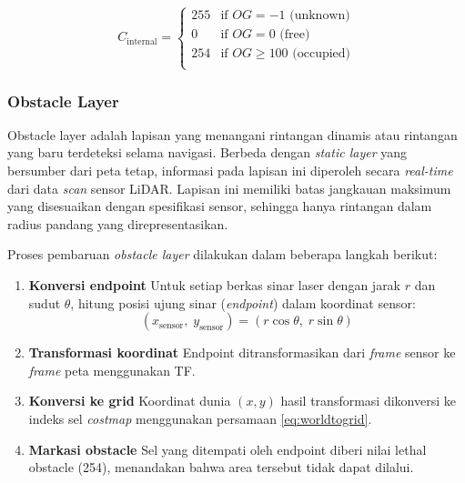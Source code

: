 \begin{equation}C_{\text{internal}} = \begin{cases} 255 & \text{if } OG = -1 \text{ (unknown)} \\ 0 & \text{if } OG = 0 \text{ (free)} \\ 254 & \text{if } OG \geq 100 \text{ (occupied)} \\  \end{cases}\end{equation}

\subsubsection{Obstacle Layer}

Obstacle layer adalah lapisan yang menangani rintangan dinamis atau
rintangan yang baru terdeteksi selama navigasi. Berbeda dengan
\emph{static layer} yang bersumber dari peta tetap, informasi pada
lapisan ini diperoleh secara \emph{real-time} dari data \emph{scan}
sensor LiDAR. Lapisan ini memiliki batas jangkauan maksimum yang
disesuaikan dengan spesifikasi sensor, sehingga hanya rintangan dalam
radius pandang yang direpresentasikan.

Proses pembaruan \emph{obstacle layer} dilakukan dalam beberapa
langkah berikut:

\begin{enumerate}
  \item \textbf{Konversi endpoint} \newline Untuk setiap berkas sinar laser
  dengan jarak $r$ dan sudut $\theta$, hitung posisi ujung sinar
  (\emph{endpoint}) dalam koordinat sensor:
  \begin{equation}
  (x_{\text{sensor}},\; y_{\text{sensor}}) = (r\cos\theta,\; r\sin\theta)
  \end{equation}
  \item \textbf{Transformasi koordinat} \newline Endpoint ditransformasikan
  dari \emph{frame} sensor ke \emph{frame} peta menggunakan TF.
  \item \textbf{Konversi ke grid} \newline Koordinat dunia $(x, y)$ hasil
  transformasi dikonversi ke indeks sel \emph{costmap} menggunakan persamaan \ref{eq:worldtogrid}.
  \item \textbf{Markasi obstacle} \newline Sel yang ditempati oleh endpoint
  diberi nilai lethal obstacle (254), menandakan bahwa
  area tersebut tidak dapat dilalui.
\end{enumerate}

